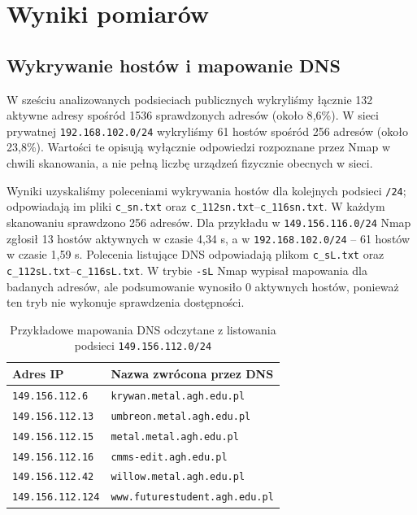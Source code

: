 \documentclass[11pt,a4paper]{article}
\begin{document}
\section{Wyniki pomiarów}
\subsection{Wykrywanie hostów i mapowanie DNS}
W sześciu analizowanych podsieciach publicznych wykryliśmy łącznie 132 aktywne
adresy spośród 1536 sprawdzonych adresów (około
8{,}6\%). W sieci prywatnej \texttt{192.168.102.0/24} wykryliśmy 61 hostów spośród
256 adresów (około 23{,}8\%). Wartości te opisują wyłącznie odpowiedzi rozpoznane
przez Nmap w chwili skanowania, a nie pełną liczbę urządzeń fizycznie obecnych
w sieci.

Wyniki uzyskaliśmy poleceniami wykrywania hostów dla kolejnych podsieci
\texttt{/24}; odpowiadają im pliki \texttt{c\_sn.txt} oraz
\texttt{c\_112sn.txt}--\texttt{c\_116sn.txt}. W każdym skanowaniu sprawdzono 256
adresów. Dla przykładu w \texttt{149.156.116.0/24} Nmap zgłosił 13 hostów
aktywnych w czasie 4{,}34 s, a w \texttt{192.168.102.0/24} -- 61 hostów
w czasie 1{,}59 s. Polecenia listujące DNS odpowiadają plikom
\texttt{c\_sL.txt} oraz \texttt{c\_112sL.txt}--\texttt{c\_116sL.txt}.
W trybie \texttt{-sL} Nmap wypisał mapowania dla badanych adresów, ale
podsumowanie wynosiło 0 aktywnych hostów, ponieważ ten tryb nie wykonuje
sprawdzenia dostępności.

\begin{table}[H]
\centering
\caption{Przykładowe mapowania DNS odczytane z listowania podsieci
\texttt{149.156.112.0/24}}
\begin{tabular}{ll}
\toprule
\textbf{Adres IP} & \textbf{Nazwa zwrócona przez DNS}\\
\midrule
\texttt{149.156.112.6} & \texttt{krywan.metal.agh.edu.pl}\\
\texttt{149.156.112.13} & \texttt{umbreon.metal.agh.edu.pl}\\
\texttt{149.156.112.15} & \texttt{metal.metal.agh.edu.pl}\\
\texttt{149.156.112.16} & \texttt{cmms-edit.agh.edu.pl}\\
\texttt{149.156.112.42} & \texttt{willow.metal.agh.edu.pl}\\
\texttt{149.156.112.124} & \texttt{www.futurestudent.agh.edu.pl}\\
\bottomrule
\end{tabular}
\end{table}
\end{document}
